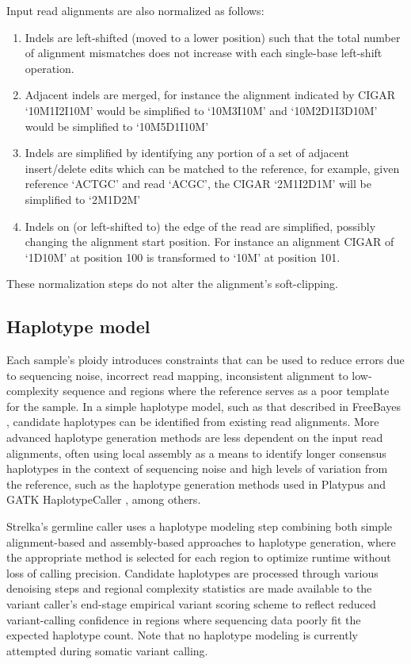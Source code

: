 \documentclass{article}
\begin{document}
Input read alignments are also normalized as follows:
\begin{enumerate}
    \item Indels are left-shifted (moved to a lower position) such that the total number of alignment mismatches does not increase with each single-base left-shift operation.
    \item Adjacent indels are merged, for instance the alignment indicated by CIGAR `10M1I2I10M' would be simplified to `10M3I10M' and `10M2D1I3D10M' would be simplified to `10M5D1I10M'
    \item Indels are simplified by identifying any portion of a set of adjacent insert/delete edits which can be matched to the reference, for example, given reference `ACTGC' and read `ACGC', the CIGAR `2M1I2D1M' will be simplified to `2M1D2M'
    \item Indels on (or left-shifted to) the edge of the read are simplified, possibly changing the alignment start position. For instance an alignment CIGAR of `1D10M' at position 100 is transformed to `10M' at position 101.
\end{enumerate}
These normalization steps do not alter the alignment's soft-clipping.

\subsection{Haplotype model}

Each sample's ploidy introduces constraints that can be used to reduce errors due to sequencing noise, incorrect read mapping, inconsistent alignment to low-complexity sequence and regions where the reference serves as a poor template for the sample. In a simple haplotype model, such as that described in FreeBayes \cite{garrison2012}, candidate haplotypes can be identified from existing read alignments. More advanced haplotype generation methods are less dependent on the input read alignments, often using local assembly as a means to identify longer consensus haplotypes in the context of sequencing noise and high levels of variation from the reference, such as the haplotype generation methods used in Platypus \cite{rimmer2014} and GATK HaplotypeCaller \cite{depristo2011}, among others.

Strelka's germline caller uses a haplotype modeling step combining both simple alignment-based and assembly-based approaches to haplotype generation, where the appropriate method is selected for each region to optimize runtime without loss of calling precision. Candidate haplotypes are processed through various denoising steps and regional complexity statistics are made available to the variant caller's end-stage empirical variant scoring scheme to reflect reduced variant-calling confidence in regions where sequencing data poorly fit the expected haplotype count. Note that no haplotype modeling is currently attempted during somatic variant calling.
\end{document}
